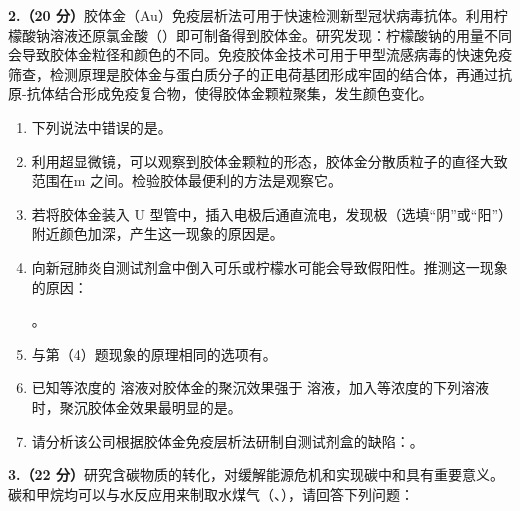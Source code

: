 \documentclass[11pt,a4paper]{article}
\begin{document}

\noindent\textbf{2.（20 分）}胶体金（Au）免疫层析法可用于快速检测新型冠状病毒抗体。利用柠檬酸钠溶液还原氯金酸（）即可制备得到胶体金。研究发现：柠檬酸钠的用量不同会导致胶体金粒径和颜色的不同。免疫胶体金技术可用于甲型流感病毒的快速免疫筛查，检测原理是胶体金与蛋白质分子的正电荷基团形成牢固的结合体，再通过抗原-抗体结合形成免疫复合物，使得胶体金颗粒聚集，发生颜色变化。

\begin{enumerate}[label=（\arabic*）]
\item 下列说法中错误的是\blank[3em]。

\item 利用超显微镜，可以观察到胶体金颗粒的形态，胶体金分散质粒子的直径大致范围在\blank[4em]m 之间。检验胶体最便利的方法是观察它\blank[4em]。

\item 若将胶体金装入 U 型管中，插入电极后通直流电，发现\blank[2.5em]极（选填“阴”或“阳”）附近颜色加深，产生这一现象的原因是\blank[8em]。

\item 向新冠肺炎自测试剂盒中倒入可乐或柠檬水可能会导致假阳性。推测这一现象的原因：\par\noindent\hspace{2em}\blank[10em]。

\item 与第（4）题现象的原理相同的选项有\blank[3em]。

\item 已知等浓度的  溶液对胶体金的聚沉效果强于  溶液，加入等浓度的下列溶液时，聚沉胶体金效果最明显的是\blank[3em]。

\item 请分析该公司根据胶体金免疫层析法研制自测试剂盒的缺陷：\blank[10em]。
\end{enumerate}


\noindent\textbf{3.（22 分）}研究含碳物质的转化，对缓解能源危机和实现碳中和具有重要意义。碳和甲烷均可以与水反应用来制取水煤气（、），请回答下列问题：
\end{document}

